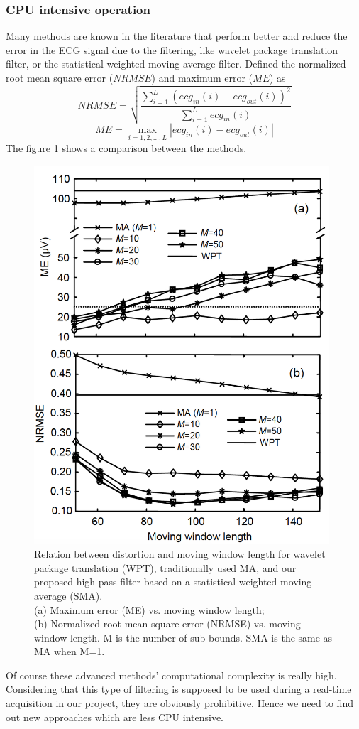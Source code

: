 \subsubsection{CPU intensive operation}
Many methods are known in the literature that perform better and reduce the error in the ECG signal due to the filtering, like wavelet package translation filter\cite{ref16}, or the statistical weighted moving average filter\cite{ref17}. Defined the normalized root mean square error ($NRMSE$) and maximum error ($ME$) as
\begin{equation}
NRMSE=\sqrt{\frac{\sum_{i=1}^{L}(ecg_{in}(i)-ecg_{out}(i))^2}{\sum_{i=1}^{L}ecg_{in}(i)}}\end{equation}
\begin{equation}
ME=\max_{i=1,2,\dots,L}|ecg_{in}(i)-ecg_{out}(i)|
\end{equation}
The figure \ref{fig6.6} shows a comparison between the methods.
\begin{figure}[ht!]
	\centering
	\includegraphics[width=110mm]{figures/ch6/6.png}
	\caption{Relation between distortion and moving window length for wavelet package translation (WPT), traditionally used MA, and our proposed high-pass filter based on a statistical weighted moving average (SMA).\\
		(a) Maximum error (ME) vs. moving window length;\\
		(b) Normalized root mean square error (NRMSE) vs. moving window length. M is the number of sub-bounds. SMA is the same as MA when M=1.}
	\label{fig6.6}
\end{figure}
Of course these advanced methods' computational complexity is really high. Considering that this type of filtering is supposed to be used during a real-time acquisition in our project, they are obviously prohibitive. Hence we need to find out new approaches which are less CPU intensive.

